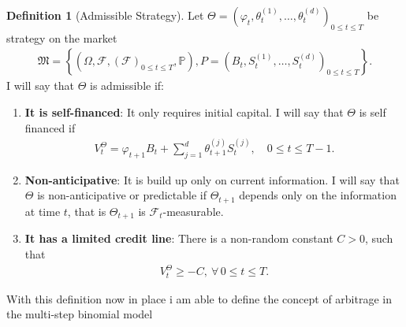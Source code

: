 \documentclass{article}
\theoremstyle{definition}
\newtheorem{definition}[theorem]{Definition}
\numberwithin{equation}{section}
\begin{document}
\begin{definition}[Admissible Strategy]
    Let $\Theta = \left(\varphi_t, \theta_t^{(1)}, \ldots, \theta_t^{(d)}\right)_{0 \leq t \leq T}$ be strategy on the market
    \begin{align}
        \mathfrak{M} =
        \left\{
            \left(
                \Omega, 
                \mathscr{F}, 
                \left(
                    \mathscr{F}
                \right)_{0 \leq t \leq T},
                \mathbb{P}
            \right),
            P =
            \left(
                B_t,
                S_t^{(1)},
                \ldots,
                S_t^{(d)}
            \right)_{0 \leq t \leq T}
        \right\}.
    \end{align}
    I will say that $\Theta$ is admissible if:
    \begin{enumerate}
        \item \textbf{It is self-financed}: It only requires initial capital.
        I will say that $\Theta$ is self financed if
        \begin{align}
            V_t^{\Theta} = \varphi_{t+1}B_t + \sum_{j=1}^d \theta_{t+1}^{(j)}S_t^{(j)}, \quad 0 \leq t \leq T-1. 
        \end{align}
        \item \textbf{Non-anticipative}: It is build up only on current information.
        I will say that $\Theta$ is non-anticipative or predictable if $\Theta_{t+1}$ depends only on the information at time $t$, that is $\Theta_{t+1}$ is $\mathscr{F}_t$-measurable.
        \item \textbf{It has a limited credit line}: There is a non-random constant $C > 0$, such that
        \begin{align}
            V_t^{\Theta} \geq -C, \ \forall \, 0 \leq t \leq T.
        \end{align}
    \end{enumerate}
\end{definition}
With this definition now in place i am able to define the concept of arbitrage in the multi-step binomial model
\end{document}
